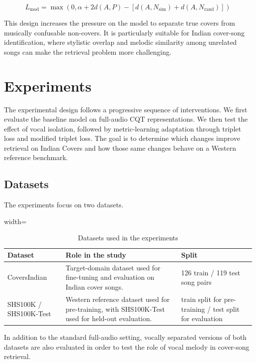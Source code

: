 \documentclass[conference]{IEEEtran}
\begin{document}
\begin{equation}
L_{\text{mod}} = \max \left(0, \alpha + 2d(A,P) - \left[d(A,N_{\text{sim}}) + d(A,N_{\text{rand}})\right] \right)
\end{equation}

This design increases the pressure on the model to separate true covers from musically confusable non-covers. It is particularly suitable for Indian cover-song identification, where stylistic overlap and melodic similarity among unrelated songs can make the retrieval problem more challenging.

\section{Experiments}
The experimental design follows a progressive sequence of interventions. We first evaluate the baseline model on full-audio CQT representations. We then test the effect of vocal isolation, followed by metric-learning adaptation through triplet loss and modified triplet loss. The goal is to determine which changes improve retrieval on Indian Covers and how those same changes behave on a Western reference benchmark.

\subsection{Datasets}
The experiments focus on two datasets.

\begin{table}[htbp]
    \caption{Datasets used in the experiments}
    \centering
    \begin{adjustbox}{width=\columnwidth}
    \begin{tabular}{p{2.5cm}p{4.1cm}p{2.1cm}}
    \toprule
    \textbf{Dataset} & \textbf{Role in the study} & \textbf{Split} \\
    \midrule
    CoversIndian & Target-domain dataset used for fine-tuning and evaluation on Indian cover songs. & 126 train / 119 test song pairs \\
    SHS100K / SHS100K-Test & Western reference dataset used for pre-training, with SHS100K-Test used for held-out evaluation. & train split for pre-training / test split for evaluation \\
    \bottomrule
    \end{tabular}
    \end{adjustbox}
\end{table}

In addition to the standard full-audio setting, vocally separated versions of both datasets are also evaluated in order to test the role of vocal melody in cover-song retrieval.
\end{document}
